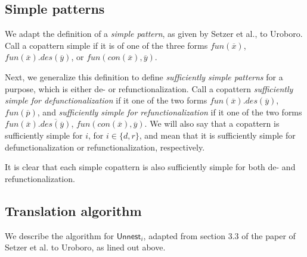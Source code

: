 \subsection{Simple patterns}

We adapt the definition of a \textit{simple pattern}, as given by Setzer et al., to Uroboro. Call a copattern simple if it is of one of the three forms $fun(\overline{x})$, $fun(\overline{x}).des(\overline{y})$, or $fun(con(\overline{x}), \overline{y})$.

Next, we generalize this definition to define \textit{sufficiently simple patterns} for a purpose, which is either de- or refunctionalization. Call a copattern \textit{sufficiently simple for defunctionalization} if it one of the two forms $fun(\overline{x}).des(\overline{y})$, $fun(\overline{p})$, and \textit{sufficiently simple for refunctionalization} if it one of the two forms $fun(\overline{x}).\overline{des(\overline{y})}$, $fun(con(\overline{x}), \overline{y})$. We will also say that a copattern is sufficiently simple for $i$, for $i \in \{d,r\}$, and mean that it is sufficiently simple for defunctionalization or refunctionalization, respectively.

It is clear that each simple copattern is also sufficiently simple for both de- and refunctionalization.

\subsection{Translation algorithm}

We describe the algorithm for $\textsf{Unnest}_i$, adapted from section 3.3 of the paper of Setzer et al. to Uroboro, as lined out above.

